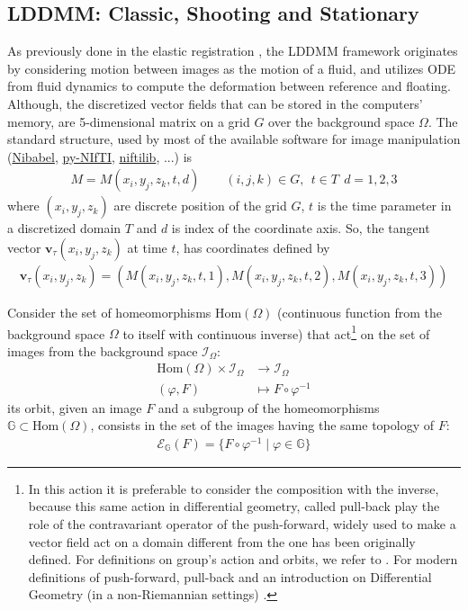 \subsection{LDDMM: Classic, Shooting and Stationary}

As previously done in the elastic registration \cite{Broit:1981}, the LDDMM framework \cite{beg2005computing} originates by considering motion between images as the motion of a fluid, and utilizes ODE from fluid dynamics to compute the deformation between reference and floating. 
Although, the discretized vector fields that can be stored in the computers' memory, are 5-dimensional matrix on a grid $G$ over the background space $\Omega$. The standard structure, used by most of the available software for image manipulation (\href{http://nipy.org/nibabel/}{Nibabel}, \href{http://niftilib.sourceforge.net/pynifti/intro.html}{py-NIfTI}, \href{http://niftilib.sourceforge.net/}{niftilib}, ...) is 
\begin{align*}
M = M(x_i,y_j,z_k,t,d) \qquad (i,j,k)\in G , ~~ t \in T  ~~ d = 1,2,3
\end{align*}
where $(x_i,y_j,z_k)$ are discrete position of the grid $G$, $t$ is the time parameter in a discretized domain $T$ and $d$ is index of the coordinate axis. So, the tangent vector $\mathbf{v}_{\tau}(x_i,y_j,z_k)$ at time $t$, has coordinates defined by
\begin{align*}
\mathbf{v}_{\tau}(x_i,y_j,z_k) = (M(x_i,y_j,z_k,t ,1), M(x_i,y_j,z_k,t,2), M(x_i,y_j,z_k,t ,3))
\end{align*}

Consider the set of homeomorphisms $\text{Hom}(\Omega)$ (continuous function from the background space $\Omega$ to itself with continuous inverse) that act\footnote{In this action it is preferable to consider the composition with the inverse, because this same action in differential geometry, called pull-back play the role of the contravariant operator of the push-forward, widely used to make a vector field act on a domain different from the one has been originally defined. For definitions on group's action and orbits, we refer to \cite{artin2011algebra}. For modern definitions of push-forward, pull-back and an introduction on Differential Geometry (in a non-Riemannian settings) \cite{lee2012introduction}.} on the set of images from the background space $\mathcal{I}_{\Omega}$:
\begin{align*}
\text{Hom}(\Omega) \times \mathcal{I}_{\Omega} & \longrightarrow  \mathcal{I}_{\Omega}   \\
(\varphi,F) &\longmapsto F\circ \varphi^{-1}
\end{align*}
its orbit, given an image $F$ and a subgroup of the homeomorphisms $\mathbb{G}\subset \text{Hom}(\Omega)$, consists in the set of the images having the same topology of $F$: 
\begin{align*}
\mathcal{E}_{\mathbb{G}}(F) = \{ F\circ \varphi^{-1} \mid \varphi \in \mathbb{G} \}
\end{align*}

